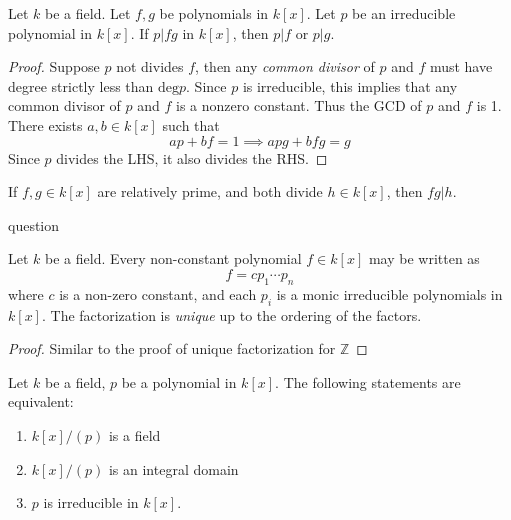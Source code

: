 \begin{proposition}
Let $k$ be a field. Let $f,g$ be polynomials in $k[x]$. Let $p$ be an irreducible polynomial in $k[x]$. If $p|fg$ in $k[x]$, then $p|f$ or $p|g$.
\end{proposition}
\begin{proof}
Suppose $p$ not divides $f$, then any \emph{common divisor} of $p$ and $f$ must have degree strictly less than $\mbox{deg}p$. Since $p$ is irreducible, this implies that any common divisor of $p$ and $f$ is a nonzero constant. Thus the GCD of $p$ and $f$ is 1. There exists $a,b\in k[x]$ such that
\[
ap+bf=1\implies
apg+bfg=g
\]
Since $p$ divides the LHS, it also divides the RHS.
\end{proof}
\begin{proposition}
If $f,g\in k[x]$ are relatively prime, and both divide $h\in k[x]$, then $fg|h$.
\end{proposition}
question
\begin{theorem}
Let $k$ be a field. Every non-constant polynomial $f\in k[x]$ may be written as
\[
f=cp_1\cdots p_n
\]
where $c$ is a non-zero constant, and each $p_i$ is a monic irreducible polynomials in $k[x]$. The factorization is \emph{unique} up to the ordering of the factors.
\end{theorem}
\begin{proof}
Similar to the proof of unique factorization for $\mathbb{Z}$
\end{proof}
\begin{theorem}
Let $k$ be a field, $p$ be a polynomial in $k[x]$. The following statements are equivalent:
\begin{enumerate}
\item
$k[x]/(p)$ is a field
\item
$k[x]/(p)$ is an integral domain
\item
$p$ is irreducible in $k[x]$.
\end{enumerate}
\end{theorem}
